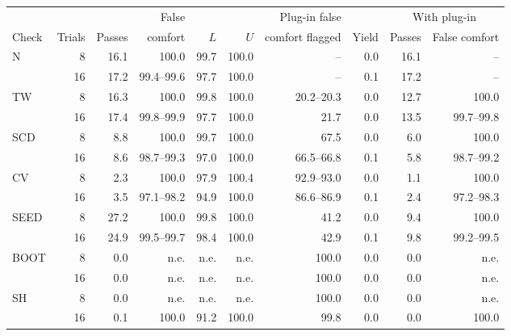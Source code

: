 \begin{tabular}{lrrrrrrrrr}
\toprule
 & & & False & & & Plug-in false & & \multicolumn{2}{c}{With plug-in} \\
\cmidrule(lr){9-10}
Check & Trials & Passes & comfort & $L$ & $U$ & comfort flagged & Yield & Passes & False comfort \\
\midrule
N & 8 & 16.1 & 100.0 & 99.7 & 100.0 & -- & 0.0 & 16.1 & -- \\
 & 16 & 17.2 & 99.4--99.6 & 97.7 & 100.0 & -- & 0.1 & 17.2 & -- \\
\addlinespace
TW & 8 & 16.3 & 100.0 & 99.8 & 100.0 & 20.2--20.3 & 0.0 & 12.7 & 100.0 \\
 & 16 & 17.4 & 99.8--99.9 & 97.7 & 100.0 & 21.7 & 0.0 & 13.5 & 99.7--99.8 \\
\addlinespace
SCD & 8 & 8.8 & 100.0 & 99.7 & 100.0 & 67.5 & 0.0 & 6.0 & 100.0 \\
 & 16 & 8.6 & 98.7--99.3 & 97.0 & 100.0 & 66.5--66.8 & 0.1 & 5.8 & 98.7--99.2 \\
\addlinespace
CV & 8 & 2.3 & 100.0 & 97.9 & 100.4 & 92.9--93.0 & 0.0 & 1.1 & 100.0 \\
 & 16 & 3.5 & 97.1--98.2 & 94.9 & 100.0 & 86.6--86.9 & 0.1 & 2.4 & 97.2--98.3 \\
\addlinespace
SEED & 8 & 27.2 & 100.0 & 99.8 & 100.0 & 41.2 & 0.0 & 9.4 & 100.0 \\
 & 16 & 24.9 & 99.5--99.7 & 98.4 & 100.0 & 42.9 & 0.1 & 9.8 & 99.2--99.5 \\
\addlinespace
BOOT & 8 & 0.0 & n.e. & n.e. & n.e. & 100.0 & 0.0 & 0.0 & n.e. \\
 & 16 & 0.0 & n.e. & n.e. & n.e. & 100.0 & 0.0 & 0.0 & n.e. \\
\addlinespace
SH & 8 & 0.0 & n.e. & n.e. & n.e. & 100.0 & 0.0 & 0.0 & n.e. \\
 & 16 & 0.1 & 100.0 & 91.2 & 100.0 & 99.8 & 0.0 & 0.0 & 100.0 \\
\bottomrule
\end{tabular}
